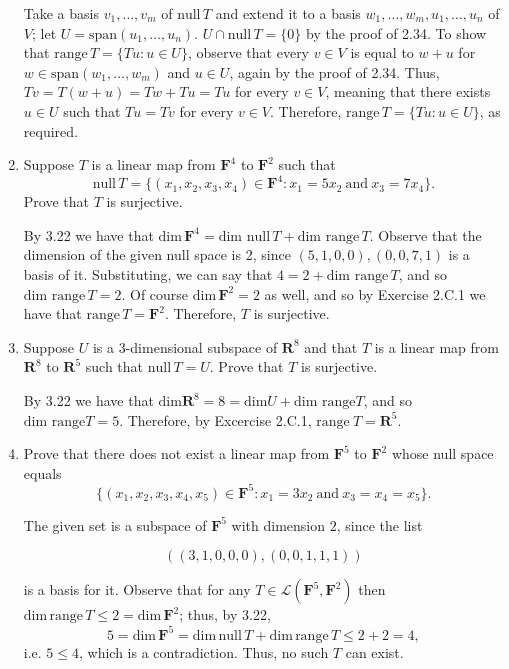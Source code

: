 \documentclass{book}
\begin{document}
\begin{enumerate}
Take a basis \(v_1,\dots,v_m\) of \(\textrm{null} \, T\) and extend it to a basis \(w_1,\dots,w_m,u_1,\dots,u_n\) of \(V\); let \(U=\textrm{span}(u_1,\dots,u_n)\).  \(U \cap \textrm{null} \, T = \{0\}\) by the proof of 2.34.  To show that \(\textrm{range} \, T=\{Tu: u \in U\}\), observe that every \(v \in V\) is equal to \(w+u\) for \(w \in \textrm{span}(w_1,\dots,w_m)\) and \(u \in U\), again by the proof of 2.34.  Thus, \(Tv=T(w+u)=Tw+Tu=Tu\) for every \(v \in V\), meaning that there exists \(u \in U\) such that \(Tu=Tv\) for every \(v \in V\).  Therefore, \(\textrm{range} \, T=\{Tu: u \in U\}\), as required.

\item Suppose \(T\) is a linear map from \(\textbf{F}^4\) to \(\textbf{F}^2\) such that \[\textrm{null} \, T=\{(x_1,x_2,x_3,x_4) \in \textbf{F}^4: x_1=5x_2 \ \textrm{and} \ x_3=7x_4\}.\]  Prove that \(T\) is surjective.

By 3.22 we have that \(\textrm{dim} \, \textbf{F}^4 = \textrm{dim null} \, T+\textrm{dim range} \, T\).  Observe that the dimension of the given null space is 2, since \((5,1,0,0),(0,0,7,1)\) is a basis of it.  Substituting, we can say that \(4=2+\textrm{dim range} \, T\), and so \(\textrm{dim range} \, T=2\).  Of course \(\textrm{dim} \, \textbf{F}^2=2\) as well, and so by Exercise 2.C.1 we have that \(\textrm{range} \, T=\textbf{F}^2\).  Therefore, \(T\) is surjective.

\item Suppose \(U\) is a 3-dimensional subspace of \(\textbf{R}^8\) and that \(T\) is a linear map from \(\textbf{R}^8\) to \(\textbf{R}^5\) such that \(\textrm{null} \, T=U\).  Prove that \(T\) is surjective.

By 3.22 we have that \(\textrm{dim} \textbf{R}^8=8=\textrm{dim}U+\textrm{dim range}T\), and so \(\textrm{dim range}T=5\).  Therefore, by Excercise 2.C.1, \(\textrm{range} \ T=\textbf{R}^5\).

\item Prove that there does not exist a linear map from \(\textbf{F}^5\) to \(\textbf{F}^2\) whose null space equals \[\{(x_1,x_2,x_3,x_4,x_5) \in \textbf{F}^5:x_1=3x_2 \ \textrm{and} \ x_3=x_4=x_5\}.\]

The given set is a subspace of \(\textbf{F}^5\) with dimension \(2\), since the list 

\begin{equation}
    ((3,1,0,0,0),(0,0,1,1,1))
\end{equation}

is a basis for it.  Observe that for any \(T \in \mathcal{L}(\textbf{F}^5,\textbf{F}^2)\) then \(\textrm{dim} \, \textrm{range} \, T \leq 2 = \textrm{dim} \, \textbf{F}^2\); thus, by 3.22, \[5 = \textrm{dim} \, \textbf{F}^5 = \textrm{dim} \, \textrm{null} \, T + \textrm{dim} \, \textrm{range} \, T \leq 2 + 2 = 4,\] i.e. \(5 \leq 4\), which is a contradiction.  Thus, no such \(T\) can exist.


\end{enumerate}
\end{document}
